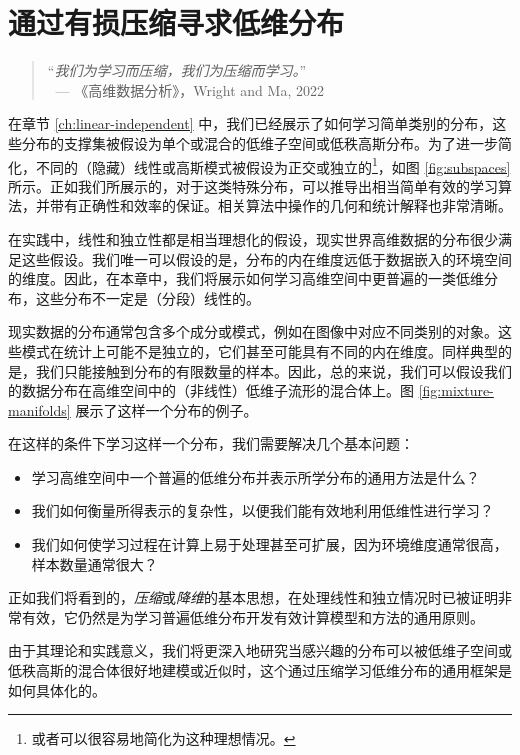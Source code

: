 \documentclass[../../book-main_zh.tex]{subfiles}
\begin{document}
\chapter{通过有损压缩寻求低维分布}
\label{ch:compression}\label{ch:general-distribution}

\begin{quote}
	\hfill    “{\em 我们为学习而压缩，我们为压缩而学习。}”\\
	$~$ \hfill --- 《高维数据分析》，Wright and Ma, 2022
\end{quote}
\vspace{5mm}

在章节 \ref{ch:linear-independent} 中，我们已经展示了如何学习简单类别的分布，这些分布的支撑集被假设为单个或混合的低维子空间或低秩高斯分布。为了进一步简化，不同的（隐藏）线性或高斯模式被假设为正交或独立的\footnote{或者可以很容易地简化为这种理想情况。}，如图 \ref{fig:subspaces} 所示。正如我们所展示的，对于这类特殊分布，可以推导出相当简单有效的学习算法，并带有正确性和效率的保证。相关算法中操作的几何和统计解释也非常清晰。

在实践中，线性和独立性都是相当理想化的假设，现实世界高维数据的分布很少满足这些假设。我们唯一可以假设的是，分布的内在维度远低于数据嵌入的环境空间的维度。因此，在本章中，我们将展示如何学习高维空间中更普遍的一类低维分布，这些分布不一定是（分段）线性的。

现实数据的分布通常包含多个成分或模式，例如在图像中对应不同类别的对象。这些模式在统计上可能不是独立的，它们甚至可能具有不同的内在维度。同样典型的是，我们只能接触到分布的有限数量的样本。因此，总的来说，我们可以假设我们的数据分布在高维空间中的（非线性）低维子流形的混合体上。图 \ref{fig:mixture-manifolds} 展示了这样一个分布的例子。

在这样的条件下学习这样一个分布，我们需要解决几个基本问题：
\begin{itemize}
	\item 学习高维空间中一个普遍的低维分布并表示所学分布的通用方法是什么？
	\item 我们如何衡量所得表示的复杂性，以便我们能有效地利用低维性进行学习？
	\item 我们如何使学习过程在计算上易于处理甚至可扩展，因为环境维度通常很高，样本数量通常很大？
\end{itemize}
正如我们将看到的，{\em 压缩}或{\em 降维}的基本思想，在处理线性和独立情况时已被证明非常有效，它仍然是为学习普遍低维分布开发有效计算模型和方法的通用原则。

由于其理论和实践意义，我们将更深入地研究当感兴趣的分布可以被低维子空间或低秩高斯的混合体很好地建模或近似时，这个通过压缩学习低维分布的通用框架是如何具体化的。
\end{document}
